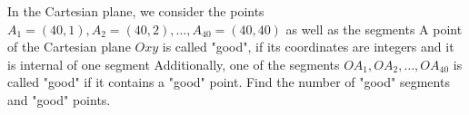 In the Cartesian plane, we consider the points ${A_1} = \left( {40,1} \right), {A_2} = \left( {40,2} \right), \ldots , {A_{40}} = \left( {40,40} \right)$ as well as the segments  A point of the Cartesian plane $Oxy$ is called "good", if its coordinates are integers and it is internal of one segment  Additionally, one of the segments $O{A_1},O{A_2},\ldots,O{A_{40}}$ is called "good" if  it contains a "good" point. Find the number of "good" segments and "good" points.
